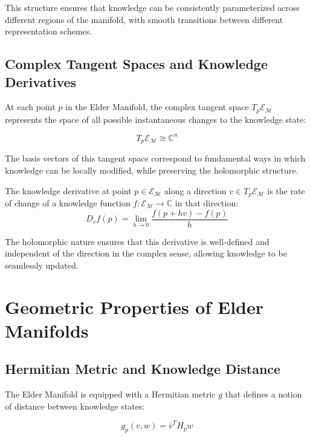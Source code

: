 This structure ensures that knowledge can be consistently parameterized across different regions of the manifold, with smooth transitions between different representation schemes.

\subsection{Complex Tangent Spaces and Knowledge Derivatives}

At each point $p$ in the Elder Manifold, the complex tangent space $T_p\mathcal{E}_{\mathcal{M}}$ represents the space of all possible instantaneous changes to the knowledge state:

\begin{equation}
T_p\mathcal{E}_{\mathcal{M}} \cong \mathbb{C}^n
\end{equation}

The basis vectors of this tangent space correspond to fundamental ways in which knowledge can be locally modified, while preserving the holomorphic structure.

\begin{definition}
The knowledge derivative at point $p \in \mathcal{E}_{\mathcal{M}}$ along a direction $v \in T_p\mathcal{E}_{\mathcal{M}}$ is the rate of change of a knowledge function $f: \mathcal{E}_{\mathcal{M}} \rightarrow \mathbb{C}$ in that direction:
\begin{equation}
D_v f(p) = \lim_{h \rightarrow 0} \frac{f(p + hv) - f(p)}{h}
\end{equation}
\end{definition}

The holomorphic nature ensures that this derivative is well-defined and independent of the direction in the complex sense, allowing knowledge to be seamlessly updated.

\section{Geometric Properties of Elder Manifolds}

\subsection{Hermitian Metric and Knowledge Distance}

The Elder Manifold is equipped with a Hermitian metric $g$ that defines a notion of distance between knowledge states:

\begin{equation}
g_p(v, w) = \overline{v}^T H_p w
\end{equation}

